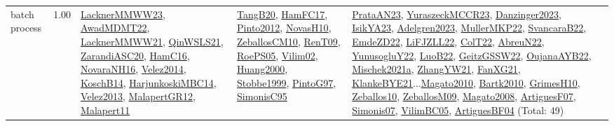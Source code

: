 {\begin{longtable}{p{3cm}r>{\raggedright\arraybackslash}p{6cm}>{\raggedright\arraybackslash}p{6cm}>{\raggedright\arraybackslash}p{8cm}}
\index{batch process}\index{Concepts!batch process}batch process &  1.00 & \hyperref[detail:LacknerMMWW23]{LacknerMMWW23}, \hyperref[detail:AwadMDMT22]{AwadMDMT22}, \hyperref[detail:LacknerMMWW21]{LacknerMMWW21}, \hyperref[detail:QinWSLS21]{QinWSLS21}, \hyperref[detail:ZarandiASC20]{ZarandiASC20}, \hyperref[detail:HamC16]{HamC16}, \hyperref[detail:NovaraNH16]{NovaraNH16}, \hyperref[detail:Velez2014]{Velez2014}, \hyperref[detail:KoschB14]{KoschB14}, \hyperref[detail:HarjunkoskiMBC14]{HarjunkoskiMBC14}, \hyperref[detail:Velez2013]{Velez2013}, \hyperref[detail:MalapertGR12]{MalapertGR12}, \hyperref[detail:Malapert11]{Malapert11} & \hyperref[detail:TangB20]{TangB20}, \hyperref[detail:HamFC17]{HamFC17}, \hyperref[detail:Pinto2012]{Pinto2012}, \hyperref[detail:NovasH10]{NovasH10}, \hyperref[detail:ZeballosCM10]{ZeballosCM10}, \hyperref[detail:RenT09]{RenT09}, \hyperref[detail:RoePS05]{RoePS05}, \hyperref[detail:Vilim02]{Vilim02}, \hyperref[detail:Huang2000]{Huang2000}, \hyperref[detail:Stobbe1999]{Stobbe1999}, \hyperref[detail:PintoG97]{PintoG97}, \hyperref[detail:SimonisC95]{SimonisC95} & \hyperref[detail:PrataAN23]{PrataAN23}, \hyperref[detail:YuraszeckMCCR23]{YuraszeckMCCR23}, \hyperref[detail:Danzinger2023]{Danzinger2023}, \hyperref[detail:IsikYA23]{IsikYA23}, \hyperref[detail:Adelgren2023]{Adelgren2023}, \hyperref[detail:MullerMKP22]{MullerMKP22}, \hyperref[detail:SvancaraB22]{SvancaraB22}, \hyperref[detail:EmdeZD22]{EmdeZD22}, \hyperref[detail:LiFJZLL22]{LiFJZLL22}, \hyperref[detail:ColT22]{ColT22}, \hyperref[detail:AbreuN22]{AbreuN22}, \hyperref[detail:YunusogluY22]{YunusogluY22}, \hyperref[detail:LuoB22]{LuoB22}, \hyperref[detail:GeitzGSSW22]{GeitzGSSW22}, \hyperref[detail:OujanaAYB22]{OujanaAYB22}, \hyperref[detail:Mischek2021a]{Mischek2021a}, \hyperref[detail:ZhangYW21]{ZhangYW21}, \hyperref[detail:FanXG21]{FanXG21}, \hyperref[detail:KlankeBYE21]{KlankeBYE21}...\hyperref[detail:Magato2010]{Magato2010}, \hyperref[detail:Bartk2010]{Bartk2010}, \hyperref[detail:GrimesH10]{GrimesH10}, \hyperref[detail:Zeballos10]{Zeballos10}, \hyperref[detail:ZeballosM09]{ZeballosM09}, \hyperref[detail:Magato2008]{Magato2008}, \hyperref[detail:ArtiguesF07]{ArtiguesF07}, \hyperref[detail:Simonis07]{Simonis07}, \hyperref[detail:VilimBC05]{VilimBC05}, \hyperref[detail:ArtiguesBF04]{ArtiguesBF04} (Total: 49)\\

\end{longtable}}

